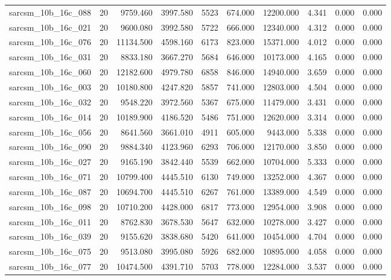 \begin{tabular}{lrrrrrrrrr}
sarcsm\_10b\_16c\_088 & 20 & 9759.460 & 3997.580 & 5523 & 674.000 & 12200.000 & 4.341 & 0.000 & 0.000 \\
sarcsm\_10b\_16c\_021 & 20 & 9600.080 & 3992.580 & 5722 & 666.000 & 12340.000 & 4.312 & 0.000 & 0.000 \\
sarcsm\_10b\_16c\_076 & 20 & 11134.500 & 4598.160 & 6173 & 823.000 & 15371.000 & 4.012 & 0.000 & 0.000 \\
sarcsm\_10b\_16c\_031 & 20 & 8833.180 & 3667.270 & 5684 & 646.000 & 10173.000 & 4.165 & 0.000 & 0.000 \\
sarcsm\_10b\_16c\_060 & 20 & 12182.600 & 4979.780 & 6858 & 846.000 & 14940.000 & 3.659 & 0.000 & 0.000 \\
sarcsm\_10b\_16c\_003 & 20 & 10180.800 & 4247.820 & 5857 & 741.000 & 12803.000 & 4.504 & 0.000 & 0.000 \\
sarcsm\_10b\_16c\_032 & 20 & 9548.220 & 3972.560 & 5367 & 675.000 & 11479.000 & 3.431 & 0.000 & 0.000 \\
sarcsm\_10b\_16c\_014 & 20 & 10189.900 & 4186.520 & 5486 & 751.000 & 12620.000 & 3.314 & 0.000 & 0.000 \\
sarcsm\_10b\_16c\_056 & 20 & 8641.560 & 3661.010 & 4911 & 605.000 & 9443.000 & 5.338 & 0.000 & 0.000 \\
sarcsm\_10b\_16c\_090 & 20 & 9884.340 & 4123.960 & 6293 & 706.000 & 12170.000 & 3.850 & 0.000 & 0.000 \\
sarcsm\_10b\_16c\_027 & 20 & 9165.190 & 3842.440 & 5539 & 662.000 & 10704.000 & 5.333 & 0.000 & 0.000 \\
sarcsm\_10b\_16c\_071 & 20 & 10799.400 & 4445.510 & 6130 & 749.000 & 13252.000 & 4.367 & 0.000 & 0.000 \\
sarcsm\_10b\_16c\_087 & 20 & 10694.700 & 4445.510 & 6267 & 761.000 & 13389.000 & 4.549 & 0.000 & 0.000 \\
sarcsm\_10b\_16c\_098 & 20 & 10710.200 & 4428.000 & 6817 & 773.000 & 12954.000 & 3.908 & 0.000 & 0.000 \\
sarcsm\_10b\_16c\_011 & 20 & 8762.830 & 3678.530 & 5647 & 632.000 & 10278.000 & 3.427 & 0.000 & 0.000 \\
sarcsm\_10b\_16c\_039 & 20 & 9155.620 & 3838.680 & 5420 & 641.000 & 10454.000 & 4.704 & 0.000 & 0.000 \\
sarcsm\_10b\_16c\_075 & 20 & 9513.080 & 3995.080 & 5926 & 682.000 & 10895.000 & 4.058 & 0.000 & 0.000 \\
sarcsm\_10b\_16c\_077 & 20 & 10474.500 & 4391.710 & 5703 & 778.000 & 12284.000 & 3.537 & 0.000 & 0.000 \\

\end{tabular}
